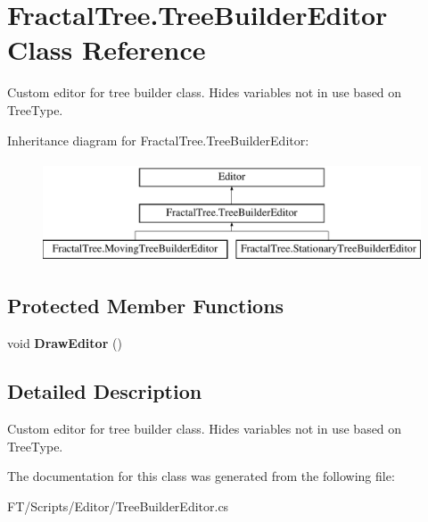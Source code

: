 \hypertarget{class_fractal_tree_1_1_tree_builder_editor}{}\section{Fractal\+Tree.\+Tree\+Builder\+Editor Class Reference}
\label{class_fractal_tree_1_1_tree_builder_editor}


Custom editor for tree builder class. Hides variables not in use based on Tree\+Type.  


Inheritance diagram for Fractal\+Tree.\+Tree\+Builder\+Editor\+:\begin{figure}[H]
\begin{center}
\leavevmode
\includegraphics[height=3.000000cm]{class_fractal_tree_1_1_tree_builder_editor}
\end{center}
\end{figure}
\subsection*{Protected Member Functions}
\begin{DoxyCompactItemize}
\item 
\mbox{\label{class_fractal_tree_1_1_tree_builder_editor_a5d41488772ecce6513f4fb335ae1e584}} 
void {\bfseries Draw\+Editor} ()
\end{DoxyCompactItemize}


\subsection{Detailed Description}
Custom editor for tree builder class. Hides variables not in use based on Tree\+Type. 



The documentation for this class was generated from the following file\+:\begin{DoxyCompactItemize}
\item 
F\+T/\+Scripts/\+Editor/Tree\+Builder\+Editor.\+cs\end{DoxyCompactItemize}
